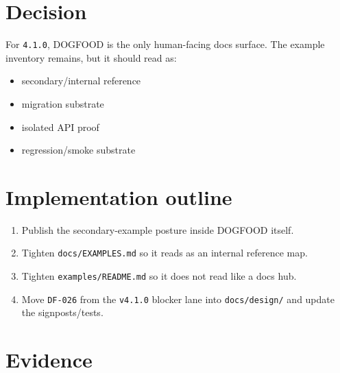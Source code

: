 \section{Decision}\label{record-087-decision}

For \texttt{4\allowbreak{}.\allowbreak{}1\allowbreak{}.\allowbreak{}0}, DOGFOOD is the only human-facing docs surface. The example inventory remains, but it should read as:

\begin{itemize}
\tightlist
\item
  secondary/internal reference
\item
  migration substrate
\item
  isolated API proof
\item
  regression/smoke substrate
\end{itemize}

\section{Implementation outline}\label{record-087-implementation-outline}

\begin{enumerate}
\def\labelenumi{\arabic{enumi}.}
\tightlist
\item
  Publish the secondary-example posture inside DOGFOOD itself.
\item
  Tighten \texttt{d\allowbreak{}o\allowbreak{}c\allowbreak{}s\allowbreak{}/\allowbreak{}E\allowbreak{}X\allowbreak{}A\allowbreak{}M\allowbreak{}P\allowbreak{}L\allowbreak{}E\allowbreak{}S\allowbreak{}.\allowbreak{}m\allowbreak{}d} so it reads as an internal reference map.
\item
  Tighten \texttt{e\allowbreak{}x\allowbreak{}a\allowbreak{}m\allowbreak{}p\allowbreak{}l\allowbreak{}e\allowbreak{}s\allowbreak{}/\allowbreak{}R\allowbreak{}E\allowbreak{}A\allowbreak{}D\allowbreak{}M\allowbreak{}E\allowbreak{}.\allowbreak{}m\allowbreak{}d} so it does not read like a docs hub.
\item
  Move \texttt{D\allowbreak{}F\allowbreak{}-\allowbreak{}0\allowbreak{}2\allowbreak{}6} from the \texttt{v\allowbreak{}4\allowbreak{}.\allowbreak{}1\allowbreak{}.\allowbreak{}0} blocker lane into \texttt{d\allowbreak{}o\allowbreak{}c\allowbreak{}s\allowbreak{}/\allowbreak{}d\allowbreak{}e\allowbreak{}s\allowbreak{}i\allowbreak{}g\allowbreak{}n\allowbreak{}/} and update the signposts/tests.
\end{enumerate}

\section{Evidence}\label{record-087-evidence}

